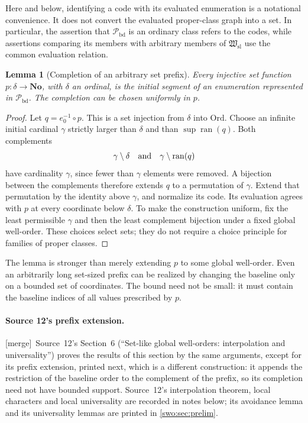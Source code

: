 \documentclass[11pt]{article}
\newtheorem{lemma}[lemma]{Lemma}
\theoremstyle{definition}
\theoremstyle{remark}
\newcommand{\No}{\mathbf{No}}
\newcommand{\Ord}{\mathrm{Ord}}
\newcommand{\Hsl}{\mathfrak W_{\mathrm{sl}}}
\newcommand{\Pbd}{\mathcal P_{\mathrm{bd}}}
\newcommand{\ran}{\operatorname{ran}}
\newcommand{\merge}{\textsf{[merge]}}
\begin{document}
Here and below, identifying a code with its evaluated enumeration is a
notational convenience.  It does not convert the evaluated proper-class graph
into a set.  In particular, the assertion that $\Pbd$ is an ordinary class
refers to the codes, while assertions comparing its members with arbitrary
members of $\Hsl$ use the common evaluation relation.

\begin{lemma}[Completion of an arbitrary set prefix]\label{swo:gl:completion}
Every injective set function $p:\delta\to\No$, with $\delta$ an ordinal,
is the initial segment of an enumeration represented in $\Pbd$.
The completion can be chosen uniformly in $p$.
\end{lemma}

\begin{proof}
Let $q=e_0^{-1}\circ p$.  This is a set injection from $\delta$ into
$\Ord$.  Choose an infinite initial cardinal $\gamma$ strictly larger than
$\delta$ and than $\sup\ran(q)$.  Both complements
\[
 \gamma\setminus\delta
 \quad\hbox{and}\quad
 \gamma\setminus\ran(q)
\]
have cardinality $\gamma$, since fewer than $\gamma$ elements were removed.
A bijection between the complements therefore extends $q$ to a permutation
of $\gamma$.  Extend that permutation by the identity above $\gamma$, and
normalize its code.  Its evaluation agrees with $p$ at every coordinate below
$\delta$.  To make the construction uniform, fix the least permissible
$\gamma$ and then the least complement bijection under a fixed global
well-order.  These choices select sets; they do not require a choice principle
for families of proper classes.
\end{proof}

The lemma is stronger than merely extending $p$ to some global well-order.
Even an arbitrarily long set-sized prefix can be realized by changing the
baseline only on a bounded set of coordinates.  The bound need not be small:
it must contain the baseline indices of all values prescribed by $p$.


\paragraph{Source 12's prefix extension.}\label{swo:st:sec:setlike}
\merge\ Source~12's Section~6 (``Set-like global well-orders: interpolation
and universality'') proves the results of this section by the same arguments,
except for its prefix extension, printed next, which is a different
construction: it appends the restriction of the baseline order to the
complement of the prefix, so its completion need not have bounded support.
Source~12's interpolation theorem, local characters and local universality are
recorded in notes below; its avoidance lemma and its universality lemmas are
printed in \cref{swo:sec:prelim}.
\end{document}
